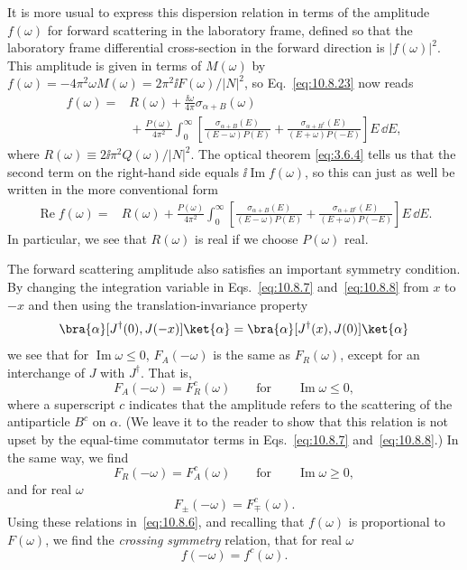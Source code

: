 It is more usual to express this dispersion relation in terms of the
amplitude $f(\omega)$ for forward scattering in the laboratory frame,
defined so that the laboratory frame differential cross-section in the forward
direction is $|f(\omega)|^2$. This amplitude is given in terms of $M(\omega)$
by $f(\omega)=-4\pi^2\omega M(\omega)=2\pi^2\ii F(\omega)/|N|^2$, so
Eq.~\eqref{eq:10.8.23} now reads
\begin{align*}
  f(\omega)={}&R(\omega)+\frac{\ii\omega}{4\pi}
  \sigma_{\alpha+B}(\omega)\\
  &{}+\frac{P(\omega)}{4\pi^2}\int_0^\infty
  \left[\frac{\sigma_{\alpha+B}(E)}{(E-\omega)P(E)}
  +\frac{\sigma_{\alpha+B^c}(E)}{(E+\omega)P(-E)}\right]E\,\dd E,
\end{align*}
where $R(\omega)\equiv2\ii\pi^2Q(\omega)/|N|^2$. The optical theorem
\eqref{eq:3.6.4} tells us that the second term on the right-hand side equals
$\ii\operatorname{Im}f(\omega)$, so this can just as well be written in the more
conventional form
\begin{align}
  \operatorname{Re}f(\omega)={}&R(\omega)
  +\frac{P(\omega)}{4\pi^2}\int_0^\infty
  \left[\frac{\sigma_{\alpha+B}(E)}{(E-\omega)P(E)}
  +\frac{\sigma_{\alpha+B^c}(E)}{(E+\omega)P(-E)}\right]E\,\dd E.
  \tag{10.8.24}\label{eq:10.8.24}
\end{align}
In particular, we see that $R(\omega)$ is real if we choose $P(\omega)$ real.

The forward scattering amplitude also satisfies an important symmetry
condition. By changing the integration variable in Eqs.~\eqref{eq:10.8.7}
and~\eqref{eq:10.8.8} from $x$ to $-x$ and then using the
translation-invariance property
\begin{equation*}
  \bra{\alpha}[J^\dagger(0),J(-x)]\ket{\alpha}
  =\bra{\alpha}[J^\dagger(x),J(0)]\ket{\alpha}
\end{equation*}
we see that for $\operatorname{Im}\omega\leq0$, $F_A(-\omega)$ is the same
as $F_R(\omega)$, except for an interchange of $J$ with $J^\dagger$. That is,
\begin{equation*}
  F_A(-\omega)=F_R^c(\omega)
  \qquad\text{for}\qquad\operatorname{Im}\omega\leq0,
\end{equation*}
where a superscript $c$ indicates that the amplitude refers to the scattering
of the antiparticle $B^c$ on $\alpha$. (We leave it to the reader to show
that this relation is not upset by the equal-time commutator terms in
Eqs.~\eqref{eq:10.8.7} and~\eqref{eq:10.8.8}.) In the same way, we find
\begin{equation*}
  F_R(-\omega)=F_A^c(\omega)
  \qquad\text{for}\qquad\operatorname{Im}\omega\geq0,
\end{equation*}
and for real $\omega$
\begin{equation*}
  F_\pm(-\omega)=F_\mp^c(\omega).
\end{equation*}
Using these relations in~\eqref{eq:10.8.6}, and recalling that $f(\omega)$ is
proportional to $F(\omega)$, we find the \emph{crossing symmetry} relation,
that for real $\omega$
\begin{equation}
  f(-\omega)=f^c(\omega).
  \tag{10.8.25}\label{eq:10.8.25}
\end{equation}

